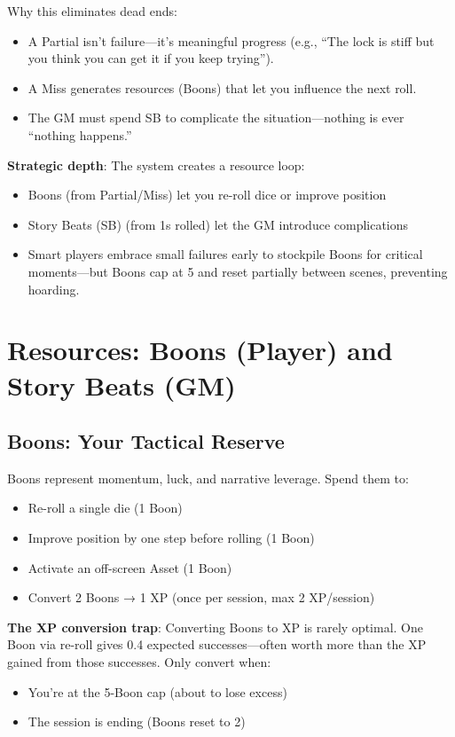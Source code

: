 \documentclass[11pt]{article}
\begin{document}
Why this eliminates dead ends:
\begin{itemize}
    \item A Partial isn't failure—it's meaningful progress (e.g., ``The lock is stiff but you think you can get it if you keep trying'').
    \item A Miss generates resources (Boons) that let you influence the next roll.
    \item The GM must spend SB to complicate the situation—nothing is ever ``nothing happens.''
\end{itemize}

\textbf{Strategic depth}: The system creates a resource loop:
\begin{itemize}
    \item Boons (from Partial/Miss) let you re-roll dice or improve position
    \item Story Beats (SB) (from 1s rolled) let the GM introduce complications
    \item Smart players embrace small failures early to stockpile Boons for critical moments—but Boons cap at 5 and reset partially between scenes, preventing hoarding.
\end{itemize}

\section{Resources: Boons (Player) and Story Beats (GM)}

\subsection{Boons: Your Tactical Reserve}
Boons represent momentum, luck, and narrative leverage. Spend them to:
\begin{itemize}
    \item Re-roll a single die (1 Boon)
    \item Improve position by one step before rolling (1 Boon)
    \item Activate an off-screen Asset (1 Boon)
    \item Convert 2 Boons → 1 XP (once per session, max 2 XP/session)
\end{itemize}

\textbf{The XP conversion trap}: Converting Boons to XP is rarely optimal. One Boon via re-roll gives 0.4 expected successes—often worth more than the XP gained from those successes. Only convert when:
\begin{itemize}
    \item You're at the 5-Boon cap (about to lose excess)
    \item The session is ending (Boons reset to 2)
\end{itemize}
\end{document}
